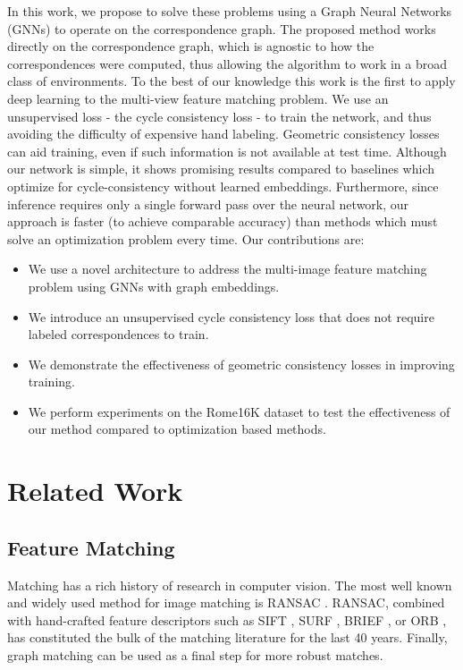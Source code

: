 \documentclass[10pt,twocolumn,letterpaper]{article}
\begin{document}
In this work, we propose to solve these problems using a Graph Neural Networks (GNNs) to operate on the correspondence graph.
The proposed method works directly on the correspondence graph, which is agnostic to how the correspondences were computed, thus allowing the algorithm to work in a broad class of environments.
To the best of our knowledge this work is the first to apply deep learning to the multi-view feature matching problem.
We use an unsupervised loss - the cycle consistency loss - to train the network, and thus avoiding the difficulty of expensive hand labeling.
Geometric consistency losses can aid training, even if such information is not available at test time.
Although our network is simple, it shows promising results compared to baselines which optimize for cycle-consistency without learned embeddings.
Furthermore, since inference requires only a single forward pass over the neural network, our approach is faster (to achieve comparable accuracy) than methods which must solve an optimization problem every time.
Our contributions are:
\begin{itemize}
\item We use a novel architecture to address the multi-image feature matching problem using GNNs with graph embeddings.
\item We introduce an unsupervised cycle consistency loss that does not require labeled correspondences to train.
\item We demonstrate the effectiveness of geometric consistency losses in improving training.
\item We perform experiments on the Rome16K \cite{li2010location} dataset to test the effectiveness of our method compared to optimization based methods.
\end{itemize}


\section{Related Work}

\subsection{Feature Matching}
Matching has a rich history of research in computer vision.
The most well known and widely used method for image matching is RANSAC \cite{fischler1981random}.
RANSAC, combined with hand-crafted feature descriptors such as SIFT \cite{lowe2004distinctive}, SURF \cite{bay2006surf}, BRIEF \cite{calonder2012brief}, or ORB \cite{mur2015orb}, has constituted the bulk of the matching literature for the last 40 years.
Finally, graph matching \cite{suh2015subgraph, hu2016distributable} can be used as a final step for more robust matches.
\end{document}
